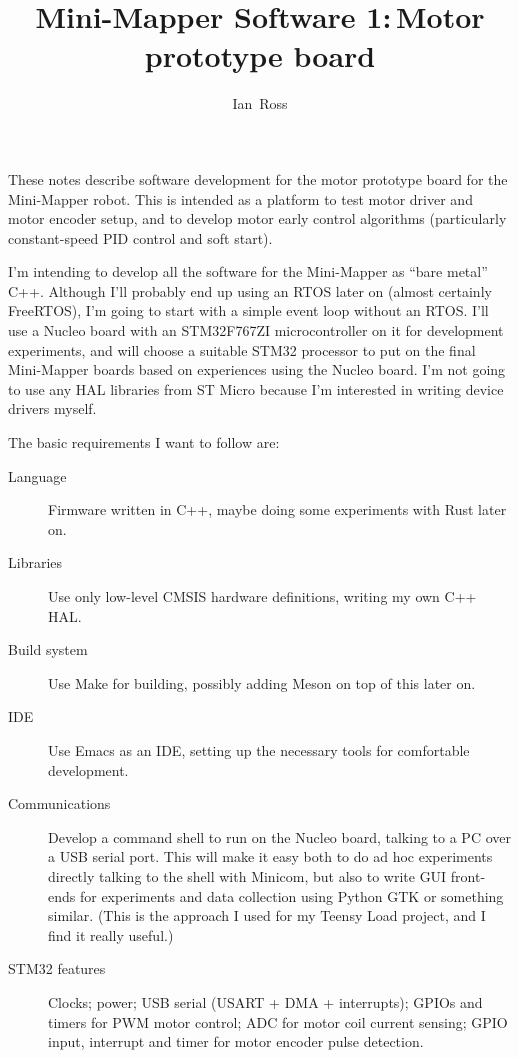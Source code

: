 \documentclass[a4paper,11pt,article]{memoir}
\title{Mini-Mapper Software 1:\,Motor prototype board}
\author{Ian~Ross}
\begin{document}
\maketitle

These notes describe software development for the motor prototype
board for the Mini-Mapper robot. This is intended as a platform to
test motor driver and motor encoder setup, and to develop motor early
control algorithms (particularly constant-speed PID control and soft
start).

I'm intending to develop all the software for the Mini-Mapper as
``bare metal'' C++. Although I'll probably end up using an RTOS later
on (almost certainly FreeRTOS), I'm going to start with a simple event
loop without an RTOS. I'll use a Nucleo board with an STM32F767ZI
microcontroller on it for development experiments, and will choose a
suitable STM32 processor to put on the final Mini-Mapper boards based
on experiences using the Nucleo board. I'm not going to use any HAL
libraries from ST Micro because I'm interested in writing device
drivers myself.

The basic requirements I want to follow are:

\begin{description}
  \item[Language]{Firmware written in C++, maybe doing some
    experiments with Rust later on.}
  \item[Libraries]{Use only low-level CMSIS hardware definitions,
    writing my own C++ HAL.}
  \item[Build system]{Use Make for building, possibly adding Meson on
    top of this later on.}
  \item[IDE]{Use Emacs as an IDE, setting up the necessary tools for
    comfortable development.}
  \item[Communications]{Develop a command shell to run on the Nucleo
    board, talking to a PC over a USB serial port. This will make it
    easy both to do ad hoc experiments directly talking to the shell
    with Minicom, but also to write GUI front-ends for experiments and
    data collection using Python GTK or something similar. (This is
    the approach I used for my Teensy Load project, and I find it
    really useful.)}
  \item[STM32 features]{Clocks; power; USB serial (USART + DMA +
    interrupts); GPIOs and timers for PWM motor control; ADC for motor
    coil current sensing; GPIO input, interrupt and timer for motor
    encoder pulse detection.}
\end{description}
\end{document}
